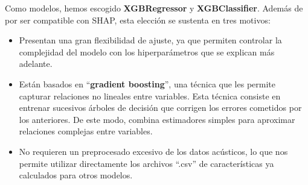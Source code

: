 Como modelos, hemos escogido \textbf{XGBRegressor} y \textbf{XGBClassifier}. Además de por ser compatible con SHAP, esta elección se sustenta en tres motivos:
\begin{itemize}
    \item Presentan una gran flexibilidad de ajuste, ya que permiten controlar la complejidad del modelo con los hiperparámetros que se explican más adelante.
    \item Están basados en ``\textbf{gradient boosting}'', una técnica que les permite capturar relaciones no lineales entre variables. Esta técnica consiste en entrenar sucesivos árboles de decisión que corrigen los errores cometidos por los anteriores. De este modo, combina estimadores simples para aproximar relaciones complejas entre variables.
    \item No requieren un preprocesado excesivo de los datos acústicos, lo que nos permite utilizar directamente los archivos ``.csv'' de características ya calculados para otros modelos.
\end{itemize}

